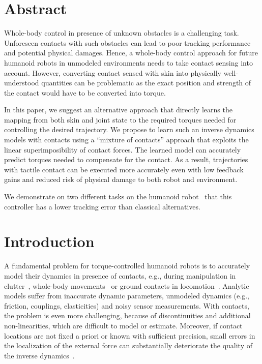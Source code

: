 



\section*{Abstract}
Whole-body control in presence of unknown obstacles is a challenging task.
Unforeseen contacts with such obstacles can lead to poor tracking performance
and potential physical damages. Hence, a whole-body control approach for future
humanoid robots in unmodeled environments needs to take contact sensing into
account. However, converting contact sensed with skin into physically
well-understood quantities can be problematic as the exact position and strength
of the contact would have to be converted into torque. 


In this paper, we suggest an alternative approach that directly learns the
mapping from both skin and joint state to the required torques needed for
controlling the desired trajectory. We propose to learn such an inverse dynamics
models with contacts using a ``mixture of contacts'' approach that exploits the
linear superimposibility of contact forces. The learned model can accurately
predict torques needed to compensate for the contact.  As a result, trajectories
with tactile contact can be executed more accurately even with low feedback
gains and reduced risk of physical damage to both robot and environment. 


We demonstrate on two different tasks on the humanoid robot~\robot{} that this
controller has a lower tracking error than classical alternatives.



\section{Introduction}
\label{sec:robIROS_Introduction}


A fundamental problem for torque-controlled humanoid robots is to accurately model their dynamics in presence of contacts, e.g., during manipulation in clutter~\cite{Jain2013}, whole-body movements~\cite{Kajita2008} or ground contacts in locomotion~\cite{Calandra2014}.
Analytic models suffer from inaccurate dynamic parameters, unmodeled dynamics (e.g., friction, couplings, elasticities) and noisy sensor measurements.
With contacts, the problem is even more challenging, because of discontinuities and additional non-linearities, which are difficult to model or estimate.
Moreover, if contact locations are not fixed a priori or known with sufficient precision, small errors in the localization of the external force can substantially deteriorate the quality of the inverse dynamics~\cite{DelPrete2012}.

